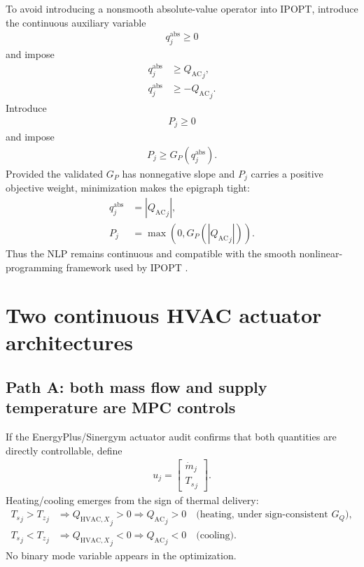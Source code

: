 \documentclass[11pt]{article}
\newcommand{\Ts}{T_s}
\newcommand{\Tz}{T_z}
\newcommand{\mdot}{\dot m}
\newcommand{\QAC}{Q_{\mathrm{AC}}}
\newcommand{\QHX}{Q_{\mathrm{HVAC},X}}
\begin{document}
To avoid introducing a nonsmooth absolute-value operator into IPOPT, introduce the continuous
auxiliary variable
\begin{align}
q^{\mathrm{abs}}_j\ge0
\end{align}
and impose
\begin{align}
q^{\mathrm{abs}}_j&\ge {\QAC}_j,
\\
q^{\mathrm{abs}}_j&\ge-{\QAC}_j.
\tag{6.26}
\end{align}
Introduce
\begin{align}
P_j\ge0
\end{align}
and impose
\begin{align}
P_j\ge G_P(q^{\mathrm{abs}}_j).
\tag{6.27}
\end{align}
Provided the validated \(G_P\) has nonnegative slope and \(P_j\) carries a positive objective
weight, minimization makes the epigraph tight:
\begin{align}
q^{\mathrm{abs}}_j&=|{\QAC}_j|,
\\
P_j&=\max\!\left(0,G_P(|{\QAC}_j|)\right).
\tag{6.28}
\end{align}
Thus the NLP remains continuous and compatible with the smooth nonlinear-programming framework
used by IPOPT \citep{wachter2006ipopt}.

\section{Two continuous HVAC actuator architectures}

\subsection{Path A: both mass flow and supply temperature are MPC controls}

If the EnergyPlus/Sinergym actuator audit confirms that both quantities are directly controllable,
define
\begin{align}
\boxed{
u_j=
\begin{bmatrix}
\mdot_j\\
{\Ts}_j
\end{bmatrix}.
}
\tag{6.29}
\end{align}
Heating/cooling emerges from the sign of thermal delivery:
\begin{align}
{\Ts}_j>{\Tz}_j
&\Longrightarrow
{\QHX}_j>0
\Longrightarrow
{\QAC}_j>0
\quad\text{(heating, under sign-consistent }G_Q),
\\
{\Ts}_j<{\Tz}_j
&\Longrightarrow
{\QHX}_j<0
\Longrightarrow
{\QAC}_j<0
\quad\text{(cooling).}
\tag{6.30}
\end{align}
No binary mode variable appears in the optimization.
\end{document}
